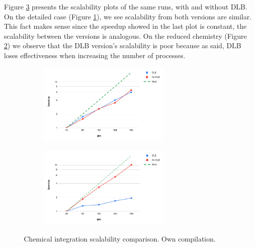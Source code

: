 Figure \ref{fig:plot-hybrid-dlb-int-mul-scal} presents the scalability plots of the same runs, with and without DLB. On the detailed case (Figure \ref{fig:plot-hybrid-dlb-int-mul-scal-det}), we see scalability from both versions are similar. This fact makes sense since the speedup showed in the last plot is constant, the scalability between the versions is analogous. On the reduced chemistry (Figure \ref{fig:plot-hybrid-dlb-int-mul-scal-red}) we observe that the DLB version's scalability is poor because as said, DLB loses effectiveness when increasing the number of processes.

\begin{figure}[ht]
  \begin{subfigure}{1\textwidth}
    \centering
    \includegraphics[width=0.7\textwidth]{graphics/hybridcompletedlbmultiscal.png}
    \label{fig:plot-hybrid-dlb-int-mul-scal-det}

  \end{subfigure}
  \begin{subfigure}{1\textwidth}
    \centering
    \includegraphics[width=0.7\textwidth]{graphics/hybridreduceddlbmultiscal.png}
    \label{fig:plot-hybrid-dlb-int-mul-scal-red}

  \end{subfigure}

  \caption[Chemical integration scalability comparison]{Chemical integration scalability comparison. Own compilation.}
  \label{fig:plot-hybrid-dlb-int-mul-scal}
\end{figure}
